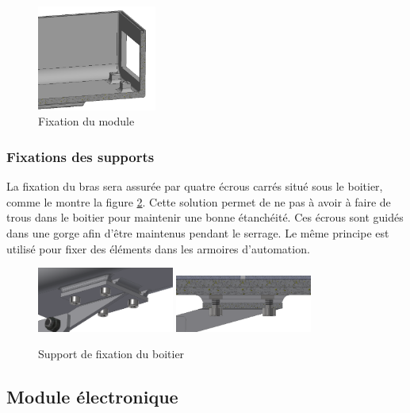 \begin{figure}[H]
    \centering
    \includegraphics[width=0.35\textwidth]{Images/photos_PGA/fixationbaseModule.PNG}
    \caption{Fixation du module}
    \label{fig:fixbase}
\end{figure}

\subsubsection{Fixations des supports}

La fixation du bras sera assurée par quatre écrous carrés situé sous le boitier, comme le montre la figure 
\ref{fig:supportfix}. Cette solution permet de 
ne pas à avoir à faire de trous dans le boitier pour maintenir une bonne étanchéité. Ces écrous sont 
guidés dans une gorge afin d’être maintenus pendant le serrage. Le même principe est utilisé pour 
fixer des éléments dans les armoires d'automation.

\begin{figure}[H]
    \centering
    \includegraphics[width=0.4\textwidth]{Images/photos_PGA/fixdessous2.PNG}
    \includegraphics[width=0.4\textwidth]{Images/photos_PGA/écroucarré.PNG}
    \caption{Support de fixation du boitier}
    \label{fig:supportfix}
\end{figure}

\subsection{Module électronique}

